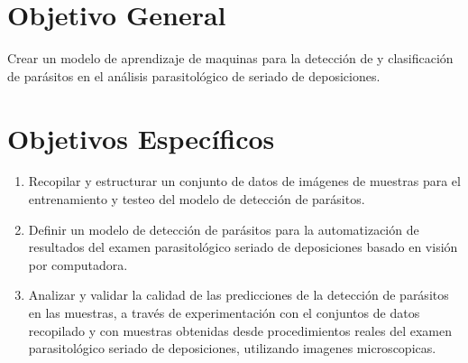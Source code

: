 \documentclass[letter,12pt]{report}
\begin{document}

\section{Objetivo General}
Crear un modelo de aprendizaje de maquinas para la detección de y clasificación de
parásitos en el análisis parasitológico de seriado de deposiciones.

\section{Objetivos Específicos}
\begin{enumerate}\justifying
    \item Recopilar y estructurar un conjunto de datos de imágenes de muestras para el entrenamiento y testeo del modelo de detección de parásitos.
  \item Definir un modelo de detección de parásitos para la automatización de resultados del examen parasitológico seriado de deposiciones basado en visión por computadora.
  \item Analizar y validar la calidad de las predicciones de la detección de parásitos en las muestras, a través de experimentación con el conjuntos de datos recopilado y con muestras obtenidas desde procedimientos reales del examen parasitológico seriado de deposiciones, utilizando imagenes microscopicas.
\end{enumerate}

%
\end{document}
